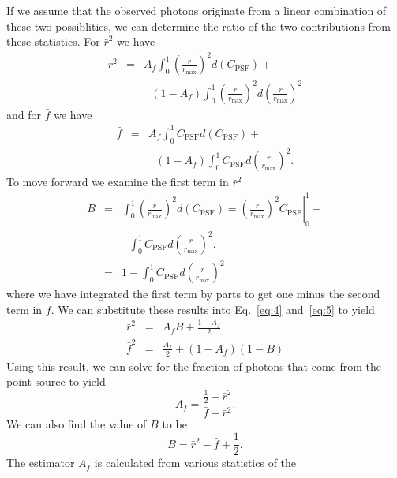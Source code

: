 \documentclass[useAMS,usenatbib]{mn2e}
\begin{document}
If we assume that the observed photons originate from a linear
combination of these two possiblities, we can determine the ratio of
the two contributions from these statistics.  For $\bar r^2$ we have
\begin{eqnarray}
  \bar r^2 &=& A_f \int_0^1 \left (\frac{r}{r_\mathrm{max}} \right )^2 d \left (C_\mathrm{PSF} \right ) + \label{eq:4} \\
  & & ~~~ 
   (1 - A_f) \int_0^1 \left (\frac{r}{r_\mathrm{max}} \right )^2 d \left (\frac{r}{r_\mathrm{max}} \right )^2 \nonumber
\end{eqnarray}
and for $\bar f$ we have
\begin{eqnarray}
  \bar f &=& A_f \int_0^1 C_\mathrm{PSF}  d \left (C_\mathrm{PSF} \right ) + \label{eq:5} \\
  & & ~~~  (1 - A_f) \int_0^1 C_\mathrm{PSF} d \left (\frac{r}{r_\mathrm{max}} \right )^2.
    \nonumber
\end{eqnarray}
To move forward we examine the first term in $\bar r^2$
\begin{eqnarray}
  B &=& \int_0^1 \left (\frac{r}{r_\mathrm{max}} \right )^2 d \left (C_\mathrm{PSF} \right )
  = \left . \left (\frac{r}{r_\mathrm{max}} \right )^2 C_\mathrm{PSF} \right |_0^1 - \\
  \label{eq:6}
  & & ~~~  \int_0^1 C_\mathrm{PSF} d \left (\frac{r}{r_\mathrm{max}} \right )^2. \nonumber \\
  &=& 1 - \int_0^1 C_\mathrm{PSF} d \left (\frac{r}{r_\mathrm{max}} \right )^2
  \label{eq:7}
\end{eqnarray}
where we have integrated the first term by parts to get one minus the
second term in $\bar f$.  We can substitute these results into
Eq.~\ref{eq:4} and~\ref{eq:5} to yield
\begin{eqnarray}
  \bar r^2 &=& A_f B + \frac{1-A_f}{2} \label{eq:8}
  \\
  \bar f^2 &=& \frac{A_f}{2} + (1 - A_f) (1 - B) \label{eq:9}
\end{eqnarray}
Using this result, we can solve for the fraction of photons that come
from the point source to yield
\begin{equation}
  A_f=\frac{\frac{1}{2}-\bar r^2}{\bar f-\bar r^2}.
  \label{eq:10}
\end{equation} 
We can also find the value of $B$ to be
\begin{equation}
  B = \bar r^2 - \bar f + \frac{1}{2}.
  \label{eq:11}
\end{equation}
The estimator $A_f$ is calculated from various statistics of the
\end{document}

